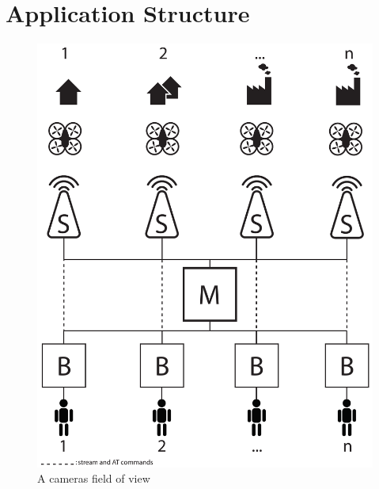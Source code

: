 \section{Application Structure}



\begin{figure}[htb]
    \centering 
    \includegraphics[width=\textwidth]{gfx/system_architecture.pdf}
    \caption{A cameras field of view}
    \label{fig:camera_properties}
\end{figure}
